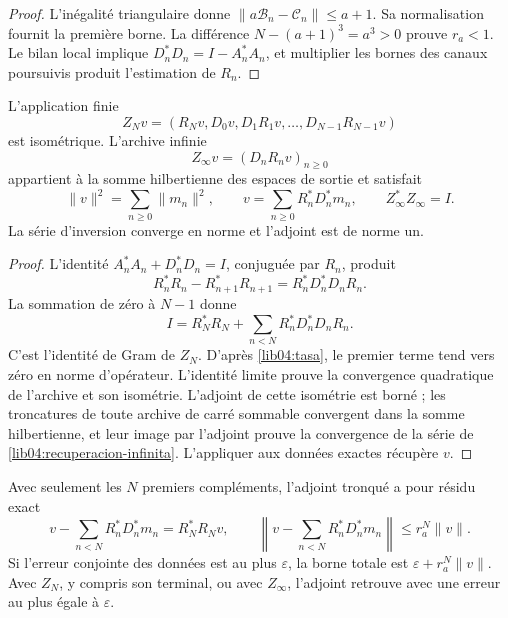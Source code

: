 \begin{proof}
L'inégalité triangulaire donne \(\|a\mathcal B_n-\mathcal C_n\|\leq a+1\). Sa normalisation fournit la première borne. La différence \(N-(a+1)^3=a^3>0\) prouve \(r_a<1\). Le bilan local implique \(D_n^*D_n=I-A_n^*A_n\), et multiplier les bornes des canaux poursuivis produit l'estimation de \(R_n\).
\end{proof}

\begin{theorem}
\label{lib04:teo-archivo}
L’application finie
\begin{equation}
 Z_Nv=(R_Nv,D_0v,D_1R_1v,\ldots,D_{N-1}R_{N-1}v)
 \label{lib04:zn}
\end{equation}
est isométrique. L’archive infinie
\begin{equation}
 Z_\infty v=(D_nR_nv)_{n\geq0}
 \label{lib04:zinfty}
\end{equation}
appartient à la somme hilbertienne des espaces de sortie et satisfait
\begin{equation}
 \|v\|^2=\sum_{n\geq0}\|m_n\|^2,\qquad
 v=\sum_{n\geq0}R_n^*D_n^*m_n,
 \qquad Z_\infty^*Z_\infty=I.
 \label{lib04:recuperacion-infinita}
\end{equation}
La série d’inversion converge en norme et l’adjoint est de norme un.
\end{theorem}

\begin{proof}
L’identité \(A_n^*A_n+D_n^*D_n=I\), conjuguée par \(R_n\),
produit
\[
 R_n^*R_n-R_{n+1}^*R_{n+1}=R_n^*D_n^*D_nR_n.
\]
La sommation de zéro à \(N-1\) donne
\begin{equation}
 I=R_N^*R_N+\sum_{n<N}R_n^*D_n^*D_nR_n.
 \label{lib04:telescopia}
\end{equation}
C'est l'identité de Gram de \(Z_N\). D'après \eqref{lib04:tasa}, le premier terme tend vers zéro en norme d'opérateur. L'identité limite prouve la convergence quadratique de l'archive et son isométrie. L'adjoint de cette isométrie est borné ; les troncatures de toute archive de carré sommable convergent dans la somme hilbertienne, et leur image par l'adjoint prouve la convergence de la série de \eqref{lib04:recuperacion-infinita}. L'appliquer aux données exactes récupère \(v\).
\end{proof}

Avec seulement les \(N\) premiers compléments, l’adjoint tronqué a pour
résidu exact
\begin{equation}
 v-\sum_{n<N}R_n^*D_n^*m_n=R_N^*R_Nv,
 \qquad
 \left\|v-\sum_{n<N}R_n^*D_n^*m_n\right\|
 \leq r_a^N\|v\|.
 \label{lib04:sesgo-truncado}
\end{equation}
Si l’erreur conjointe des données est au plus \(\varepsilon\), la
borne totale est \(\varepsilon+r_a^N\|v\|\). Avec \(Z_N\), y compris
son terminal, ou avec \(Z_\infty\), l’adjoint retrouve avec une erreur au
plus égale à \(\varepsilon\).

